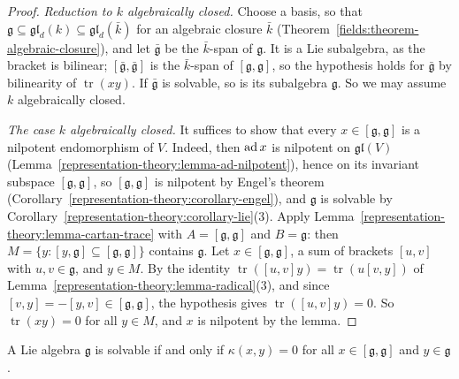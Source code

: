 \begin{proof}
\emph{Reduction to $k$ algebraically closed.} Choose a basis, so that $\mathfrak{g} \subseteq \mathfrak{gl}_d(k) \subseteq \mathfrak{gl}_d(\bar k)$ for an algebraic closure
$\bar k$ (Theorem~\ref{fields:theorem-algebraic-closure}), and let $\bar{\mathfrak{g}}$ be the $\bar k$-span of $\mathfrak{g}$. It is a Lie subalgebra, as the bracket is
bilinear; $[\bar{\mathfrak{g}}, \bar{\mathfrak{g}}]$ is the $\bar k$-span of $[\mathfrak{g}, \mathfrak{g}]$, so the hypothesis holds for $\bar{\mathfrak{g}}$ by bilinearity of
$\operatorname{tr}(xy)$. If $\bar{\mathfrak{g}}$ is solvable, so is its subalgebra $\mathfrak{g}$. So we may assume $k$ algebraically closed.

\emph{The case $k$ algebraically closed.} It suffices to show that every $x \in [\mathfrak{g}, \mathfrak{g}]$ is a nilpotent endomorphism of $V$. Indeed, then $\operatorname{ad} x$ is
nilpotent on $\mathfrak{gl}(V)$ (Lemma~\ref{representation-theory:lemma-ad-nilpotent}), hence on its invariant subspace $[\mathfrak{g}, \mathfrak{g}]$, so
$[\mathfrak{g}, \mathfrak{g}]$ is nilpotent by Engel's theorem (Corollary~\ref{representation-theory:corollary-engel}), and $\mathfrak{g}$ is solvable by
Corollary~\ref{representation-theory:corollary-lie}(3). Apply Lemma~\ref{representation-theory:lemma-cartan-trace} with $A = [\mathfrak{g}, \mathfrak{g}]$ and $B = \mathfrak{g}$:
then $M = \{y : [y, \mathfrak{g}] \subseteq [\mathfrak{g}, \mathfrak{g}]\}$ contains $\mathfrak{g}$. Let $x \in [\mathfrak{g}, \mathfrak{g}]$, a sum of brackets $[u, v]$ with
$u, v \in \mathfrak{g}$, and $y \in M$. By the identity $\operatorname{tr}([u, v]y) = \operatorname{tr}(u[v, y])$ of Lemma~\ref{representation-theory:lemma-radical}(3), and since
$[v, y] = -[y, v] \in [\mathfrak{g}, \mathfrak{g}]$, the hypothesis gives $\operatorname{tr}([u, v]y) = 0$. So $\operatorname{tr}(xy) = 0$ for all $y \in M$, and $x$ is nilpotent by
the lemma.
\end{proof}

\begin{corollary}\label{representation-theory:corollary-cartan-criterion}
A Lie algebra $\mathfrak{g}$ is solvable if and only if $\kappa(x, y) = 0$ for all $x \in [\mathfrak{g}, \mathfrak{g}]$ and $y \in \mathfrak{g}$.
\end{corollary}

